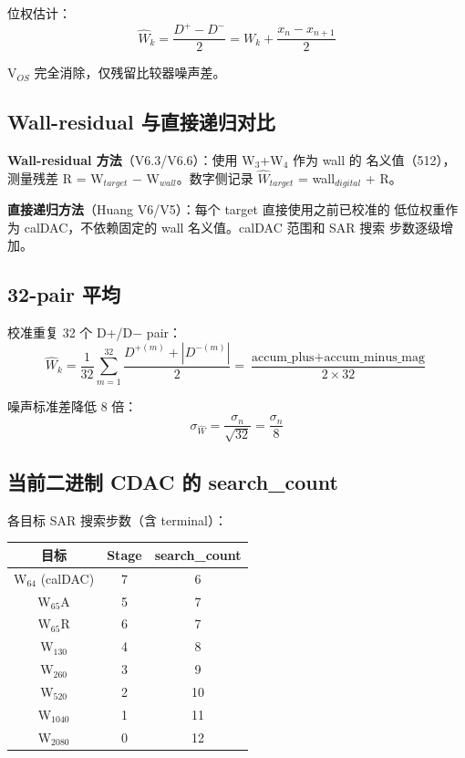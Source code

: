\documentclass[UTF8,a4paper,12pt]{ctexart}
\theoremstyle{definition}
\begin{document}
位权估计：
\begin{equation}
\hat W_k = \frac{D^+ - D^-}{2} = W_k + \frac{x_n - x_{n+1}}{2}
\end{equation}

V$_{OS}$ 完全消除，仅残留比较器噪声差。

\subsection{Wall-residual 与直接递归对比}

\textbf{Wall-residual 方法}（V6.3/V6.6）：使用 W$_3$+W$_4$ 作为 wall 的
名义值（512），测量残差 R = W$_{target}$ $-$ W$_{wall}$。数字侧记录
$\hat W_{target}$ = wall$_{digital}$ + R。

\textbf{直接递归方法}（Huang V6/V5）：每个 target 直接使用之前已校准的
低位权重作为 calDAC，不依赖固定的 wall 名义值。calDAC 范围和 SAR 搜索
步数逐级增加。

\subsection{32-pair 平均}

校准重复 32 个 D+/D$-$ pair：
\begin{equation}
\hat W_k = \frac{1}{32} \sum_{m=1}^{32} \frac{D^{+(m)} + |D^{-(m)}|}{2}
= \frac{\text{accum\_plus} + \text{accum\_minus\_mag}}{2 \times 32}
\end{equation}

噪声标准差降低 8 倍：
\begin{equation}
\sigma_{\hat W} = \frac{\sigma_n}{\sqrt{32}} = \frac{\sigma_n}{8}
\end{equation}

\subsection{当前二进制 CDAC 的 search\_count}

各目标 SAR 搜索步数（含 terminal）：

\begin{longtable}{ccc}
\toprule
\textbf{目标} & \textbf{Stage} & \textbf{search\_count} \\
\midrule
\endhead
\bottomrule
\endfoot
W$_{64}$ (calDAC) & 7 & 6 \\
W$_{65}$A & 5 & 7 \\
W$_{65}$R & 6 & 7 \\
W$_{130}$ & 4 & 8 \\
W$_{260}$ & 3 & 9 \\
W$_{520}$ & 2 & 10 \\
W$_{1040}$ & 1 & 11 \\
W$_{2080}$ & 0 & 12 \\
\bottomrule
\end{longtable}
\end{document}

